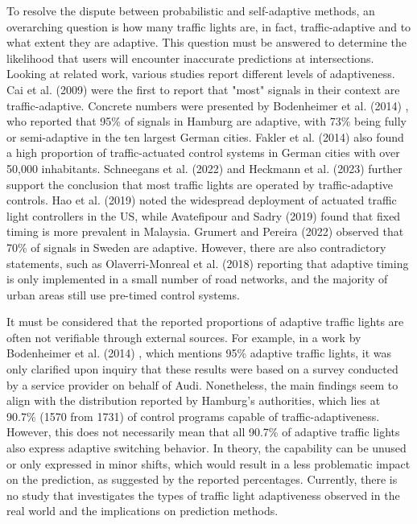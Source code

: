 To resolve the dispute between probabilistic and self-adaptive methods, an overarching question is how many traffic lights are, in fact, traffic-adaptive and to what extent they are adaptive. This question must be answered to determine the likelihood that users will encounter inaccurate predictions at intersections. Looking at related work, various studies report different levels of adaptiveness. Cai et al. (2009) \cite{cai_adaptive_2009} were the first to report that "most" signals in their context are traffic-adaptive. Concrete numbers were presented by Bodenheimer et al. (2014) \cite{bodenheimer_enabling_2014}, who reported that 95\% of signals in Hamburg are adaptive, with 73\% being fully or semi-adaptive in the ten largest German cities. Fakler et al. (2014) \cite{fakler_structures_2014} also found a high proportion of traffic-actuated control systems in German cities with over 50,000 inhabitants. Schneegans et al. (2022) \cite{scheegans_exploiting_2022} and Heckmann et al. (2023) \cite{heckmann_stage_2023} further support the conclusion that most traffic lights are operated by traffic-adaptive controls. Hao et al. (2019) \cite{hao_eco-approach_2019} noted the widespread deployment of actuated traffic light controllers in the US, while Avatefipour and Sadry (2019) \cite{avatefipour_traffic_2018} found that fixed timing is more prevalent in Malaysia. Grumert and Pereira (2022) \cite{grumert_heads-up_2022} observed that 70\% of signals in Sweden are adaptive. However, there are also contradictory statements, such as Olaverri-Monreal et al. (2018) \cite{olaverri-monreal_implementation_2018} reporting that adaptive timing is only implemented in a small number of road networks, and the majority of urban areas still use pre-timed control systems.

It must be considered that the reported proportions of adaptive traffic lights are often not verifiable through external sources. For example, in a work by Bodenheimer et al. (2014) \cite{bodenheimer_enabling_2014}, which mentions 95\% adaptive traffic lights, it was only clarified upon inquiry that these results were based on a survey conducted by a service provider on behalf of Audi. Nonetheless, the main findings seem to align with the distribution reported by Hamburg's authorities, which lies at 90.7\% (1570 from 1731) of control programs capable of traffic-adaptiveness. However, this does not necessarily mean that all 90.7\% of adaptive traffic lights also express adaptive switching behavior. In theory, the capability can be unused or only expressed in minor shifts, which would result in a less problematic impact on the prediction, as suggested by the reported percentages. Currently, there is no study that investigates the types of traffic light adaptiveness observed in the real world and the implications on prediction methods.

